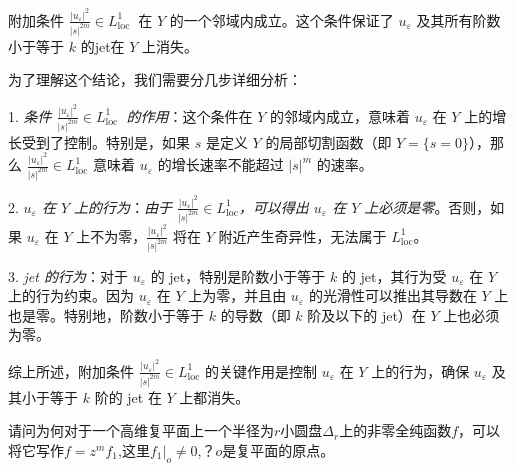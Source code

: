 \documentclass[lang=cn,12pt,fontset=none,a4paper]{beautybook}
\begin{document}
附加条件 $\frac{\left|u_{\varepsilon}\right|^2}{ |s|^{2m}} \in L_{\text {loc }}^1$ 在 $Y$ 的一个邻域内成立。这个条件保证了 $u_{\varepsilon}$ 及其所有阶数小于等于 $k$ 的jet在 $Y$ 上消失。

为了理解这个结论，我们需要分几步详细分析：


1.  \textit{条件 $\frac{\left|u_{\varepsilon}\right|^2}{ |s|^{2m}} \in L_{\text {loc }}^1$ 的作用}：这个条件在 $Y$ 的邻域内成立，意味着 $u_{\varepsilon}$ 在 $Y$ 上的增长受到了控制。特别是，如果 $s$ 是定义 $Y$ 的局部切割函数（即 $Y = \{s = 0\}$），那么 $\frac{\left|u_{\varepsilon}\right|^2}{ |s|^{2m}} \in L_{\text{loc}}^1$ 意味着 $u_{\varepsilon}$ 的增长速率不能超过 $|s|^m$ 的速率。

2.  \textit{$u_{\varepsilon}$ 在 $Y$ 上的行为}：\textit{由于 $\frac{\left|u_{\varepsilon}\right|^2}{ |s|^{2m}} \in L_{\text{loc}}^1$，可以得出 $u_{\varepsilon}$ 在 $Y$ 上必须是零}。否则，如果 $u_{\varepsilon}$ 在 $Y$ 上不为零，$\frac{\left|u_{\varepsilon}\right|^2}{ |s|^{2m}}$ 将在 $Y$ 附近产生奇异性，无法属于 $L_{\text{loc}}^1$。

3.  \textit{jet 的行为}：对于 $u_{\varepsilon}$ 的 jet，特别是阶数小于等于 $k$ 的 jet，其行为受 $u_{\varepsilon}$ 在 $Y$ 上的行为约束。因为 $u_{\varepsilon}$ 在 $Y$ 上为零，并且由 $u_{\varepsilon}$ 的光滑性可以推出其导数在 $Y$ 上也是零。特别地，阶数小于等于 $k$ 的导数（即 $k$ 阶及以下的 jet）在 $Y$ 上也必须为零。

综上所述，附加条件 $\frac{\left|u_{\varepsilon}\right|^2}{ |s|^{2m}} \in L_{\text{loc}}^1$ 的关键作用是控制 $u_{\varepsilon}$ 在 $Y$ 上的行为，确保 $u_{\varepsilon}$ 及其小于等于 $k$ 阶的 jet 在 $Y$ 上都消失。


\begin{problem}[][非零全纯函数的泰勒展开性质]
请问为何对于一个高维复平面上一个半径为$r$小圆盘$\Delta_r$上的非零全纯函数$f$，可以将它写作$f=z^m f_1$,这里$f_1|_o\neq 0$,？$o$是复平面的原点。
\end{problem}
\end{document}
